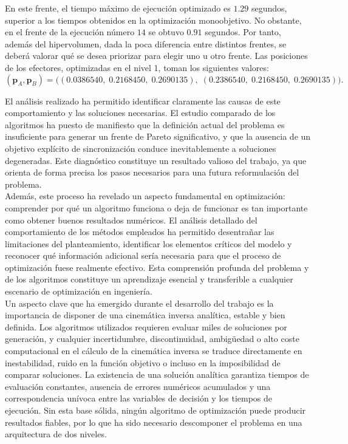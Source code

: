En este frente, el tiempo máximo de ejecución optimizado es $1.29$ segundos, superior a los tiempos 
obtenidos en la optimización monoobjetivo. No obstante, en el frente de la ejecución número $14$ se obtuvo $0.91$ segundos. 
Por tanto, además del hipervolumen, dada la poca diferencia entre distintos frentes, se deberá valorar qué se desea 
priorizar para elegir uno u otro frente. Las posiciones de los efectores, optimizadas en el nivel 1, toman los siguientes valores:
\[
(\mathbf{p}_A,\mathbf{p}_B) =
\big(
(0.0386540,\;0.2168450,\;0.2690135),\;
(0.2386540,\;0.2168450,\;0.2690135)
\big).
\] 

El análisis realizado ha permitido identificar claramente las causas de este 
comportamiento y las soluciones necesarias. El estudio comparado de los algoritmos ha puesto de manifiesto que la definición 
actual del problema es insuficiente para generar un frente de Pareto significativo, y que la ausencia de un objetivo explícito de 
sincronización conduce inevitablemente a soluciones degeneradas. Este diagnóstico constituye un resultado valioso del trabajo, ya 
que orienta de forma precisa los pasos necesarios para una futura reformulación del problema. \\

Además, este proceso ha revelado un aspecto fundamental en optimización: comprender por qué un algoritmo funciona 
o deja de funcionar es tan importante como obtener buenos resultados numéricos. El análisis detallado del comportamiento de los 
métodos empleados ha permitido desentrañar las limitaciones del planteamiento, identificar los elementos críticos del modelo y 
reconocer qué información adicional sería necesaria para que el proceso de optimización fuese realmente efectivo. Esta comprensión 
profunda del problema y de los algoritmos constituye un aprendizaje esencial y transferible a cualquier escenario de optimización 
en ingeniería. \\

Un aspecto clave que ha emergido durante el desarrollo del trabajo es la importancia de disponer de una cinemática inversa 
analítica, estable y bien definida. Los algoritmos utilizados requieren evaluar miles de soluciones por generación, y cualquier 
incertidumbre, discontinuidad, ambigüedad o alto coste computacional en el cálculo de la cinemática inversa se traduce directamente
en inestabilidad, ruido en la función 
objetivo o incluso en la imposibilidad de comparar soluciones. La existencia de una solución analítica garantiza tiempos de 
evaluación constantes, ausencia de errores numéricos acumulados y una correspondencia unívoca entre las variables de decisión y 
los tiempos de ejecución. Sin esta base sólida, ningún algoritmo de optimización puede producir 
resultados fiables, por lo que ha sido necesario descomponer el problema en una arquitectura
de dos niveles. \\


